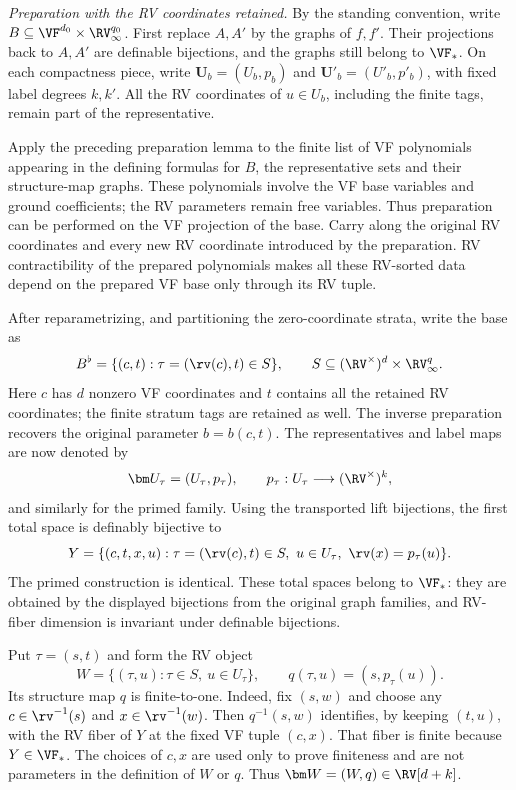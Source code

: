 \medskip
\noindent\emph{Preparation with the RV coordinates retained.}
By the standing convention, write
$B\subseteq\VF^{d_0}\times\RV_\infty^{q_0}$.
First replace $A,A'$ by the graphs of $f,f'$.
Their projections back to $A,A'$ are definable bijections,
and the graphs still belong to $\VF_*$.
On each compactness piece, write
$\bm U_b=(U_b,p_b)$ and $\bm U'_b=(U'_b,p'_b)$,
with fixed label degrees $k,k'$.
All the RV coordinates of $u\in U_b$, including the finite
tags, remain part of the representative.

Apply the preceding preparation lemma to the finite list of
VF polynomials appearing in the defining formulas for $B$,
the representative sets and their structure-map graphs.
These polynomials involve the VF base variables and ground
coefficients; the RV parameters remain free variables.
Thus preparation can be performed on the VF projection of
the base. Carry along the original RV coordinates and every
new RV coordinate introduced by the preparation.
RV contractibility of the prepared polynomials makes all
these RV-sorted data depend on the prepared VF base only
through its RV tuple.

After reparametrizing, and partitioning the zero-coordinate
strata, write the base as
\[
 B^\flat=\{(c,t):\tau=(\rv(c),t)\in S\},\qquad
 S\subseteq(\RV^\times)^d\times\RV_\infty^q.
\]
Here $c$ has $d$ nonzero VF coordinates and $t$ contains
all the retained RV coordinates; the finite stratum tags
are retained as well.
The inverse preparation recovers the original parameter
$b=b(c,t)$.
The representatives and label maps are now denoted by
\[
 \bm U_\tau=(U_\tau,p_\tau),\qquad
 p_\tau:U_\tau\longrightarrow(\RV^\times)^k,
\]
and similarly for the primed family.
Using the transported lift bijections, the first total space
is definably bijective to
\[
 Y=\{(c,t,x,u):
       \tau=(\rv(c),t)\in S,\ u\in U_\tau,\
       \rv(x)=p_\tau(u)\}.
\]
The primed construction is identical.
These total spaces belong to $\VF_*$: they are obtained by
the displayed bijections from the original graph families,
and RV-fiber dimension is invariant under definable
bijections.

Put $\tau=(s,t)$ and form the RV object
\[
 W=\{(\tau,u):\tau\in S,\ u\in U_\tau\},\qquad
 q(\tau,u)=(s,p_\tau(u)).
\]
Its structure map $q$ is finite-to-one.
Indeed, fix $(s,w)$ and choose any
$c\in\rv^{-1}(s)$ and $x\in\rv^{-1}(w)$.
Then $q^{-1}(s,w)$ identifies, by keeping $(t,u)$, with the
RV fiber of $Y$ at the fixed VF tuple $(c,x)$.
That fiber is finite because $Y\in\VF_*$.
The choices of $c,x$ are used only to prove finiteness and
are not parameters in the definition of $W$ or $q$.
Thus $\bm W=(W,q)\in\RV[d+k]$.

